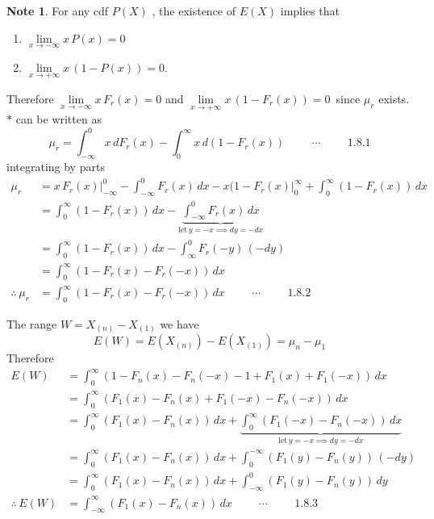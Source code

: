 \documentclass[12pt,a4paper]{report}
\theoremstyle{definition}
\newtheorem{note}[thm]{Note}
\theoremstyle{plain}
\begin{document}
\begin{note}
For any cdf $P(X)$ , the existence of $E(X)$ implies that
\end{note}
\begin{enumerate}
\item[(i)] $\lim\limits_{x \rightarrow - \infty}x\, P(x) = 0$
\item[(ii)] $\lim\limits_{x \rightarrow + \infty}x\, \left(1 - P(x)\right) = 0$.
\end{enumerate}

Therefore $\lim\limits_{x \rightarrow - \infty} x\, F_r(x)  = 0$ and $\lim\limits_{x \rightarrow + \infty}x\, \left(1 - F_r(x)\right) = 0\,$ since $\mu_r$ exists.\\

$*$ can be written as
$$\mu_r = \int^0_{-\infty}x\, dF_r(x) - \int_0^{\infty}x\, d\left(1 - F_r(x)\right)\hspace{1cm} \cdots\hspace{1cm} 1.8.1$$
integrating by parts
\begin{align*}
\mu_r & = x\, F_r(x)\Big|^0_{-\infty} - \int^0_{-\infty} F_r(x)\, dx - x(1 - F_r(x)\Big|^{\infty}_0  + \int_0^{\infty}\left(1 - F_r(x)\right)\, dx\\
& = \int^{\infty}_0 \left(1 - F_r(x)\right)\, dx - \underbrace{\int_{-\infty}^0F_r(x)\, dx}_{\text{let}\, y = -x\implies dy = -dx}\\
& = \int^{\infty}_0\left(1 - F_r(x)\right)\, dx - \int^0_{\infty}F_r(-y)\, \left(-dy\right)\\
& = \int^{\infty}_0\left(1 - F_r(x) - F_r(-x)\right)\, dx\\
\therefore\, \mu_r & = \int^{\infty}_0\left(1  - F_r(x) - F_r(-x)\right)\, dx\hspace{1cm} \cdots\hspace{1cm} 1.8.2
\end{align*}

The range $W = X_{(n)} - X_{(1)}$ we have $$E(W) = E(X_{(n)}) - E(X_{(1)}) = \mu_n - \mu_1$$
Therefore
\begin{align*}
E(W) & = \int^{\infty}_0\left(1 - F_n(x) - F_n(-x) - 1 + F_1(x) + F_1(-x)\right)\, dx\\
& = \int^{\infty}_0\left(F_1(x) - F_n(x) + F_1(-x) - F_n(-x)\right)\, dx\\
& = \int^{\infty}_0\left(F_1(x) - F_n(x)\right)\, dx + \underbrace{\int^{\infty}_0\left(F_1(-x) - F_n(-x)\right)\, dx}_{\text{let}\, y = -x\implies dy = -dx}\\
& = \int^{\infty}_0\left(F_1(x) - F_n(x)\right)\, dx + \int^{-\infty}_0\left(F_1(y)  - F_n(y)\right)\, (-dy)\\
& = \int^{\infty}_0\left(F_1(x) - F_n(x)\right)\, dx + \int^0_{-\infty}\left(F_1(y) - F_n(y)\right)\, dy\\
\therefore\, E(W) & = \int^{\infty}_{-\infty}\left(F_1(x) - F_n(x)\right)\, dx\hspace{1cm} \cdots\hspace{1cm} 1.8.3
\end{align*}
\end{document}
